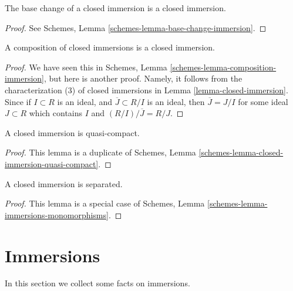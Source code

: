 \begin{lemma}
\label{lemma-base-change-closed-immersion}
The base change of a closed immersion is a closed immersion.
\end{lemma}

\begin{proof}
See Schemes, Lemma \ref{schemes-lemma-base-change-immersion}.
\end{proof}

\begin{lemma}
\label{lemma-composition-closed-immersion}
A composition of closed immersions is a closed immersion.
\end{lemma}

\begin{proof}
We have seen this in
Schemes, Lemma \ref{schemes-lemma-composition-immersion},
but here is another
proof. Namely, it follows from the characterization (3) of closed immersions
in Lemma \ref{lemma-closed-immersion}. Since if $I \subset R$
is an ideal, and $\overline{J} \subset R/I$ is an ideal, then
$\overline{J} = J/I$ for some ideal $J \subset R$ which contains
$I$ and $(R/I)/\overline{J} = R/J$.
\end{proof}

\begin{lemma}
\label{lemma-closed-immersion-quasi-compact}
A closed immersion is quasi-compact.
\end{lemma}

\begin{proof}
This lemma is a duplicate of
Schemes, Lemma \ref{schemes-lemma-closed-immersion-quasi-compact}.
\end{proof}

\begin{lemma}
\label{lemma-closed-immersion-separated}
A closed immersion is separated.
\end{lemma}

\begin{proof}
This lemma is a special case of
Schemes, Lemma \ref{schemes-lemma-immersions-monomorphisms}.
\end{proof}





\section{Immersions}
\label{section-immersions}

\noindent
In this section we collect some facts on immersions.

